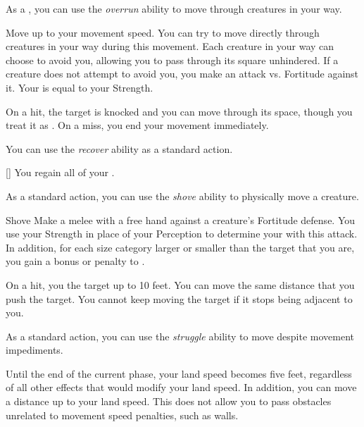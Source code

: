         As a , you can use the \textit{overrun} ability to move through creatures in your way.

        \begin{freeability}{}
            Move up to your movement speed.
            You can try to move directly through creatures in your way during this movement.
            Each creature in your way can choose to avoid you, allowing you to pass through its square unhindered.
            If a creature does not attempt to avoid you, you make an attack vs. Fortitude against it.
            Your  is equal to your Strength.

            On a hit, the target is knocked  and you can move through its space, though you treat it as .
            On a miss, you end your movement immediately.
        \end{freeability}

         You can use the \textit{recover} ability as a standard action.
        \begin{apability}{}[]
            You regain all of your .
        \end{apability}

         As a standard action, you can use the \textit{shove} ability to physically move a creature.

        \begin{freeability}{Shove}\label{Shove}
            Make a melee  with a free hand against a creature's Fortitude defense.
            You use your Strength in place of your Perception to determine your  with this attack.
            In addition, for each size category larger or smaller than the target that you are, you gain a  bonus or penalty to .

            On a hit, you  the target up to 10 feet.
            You can move the same distance that you push the target.
            You cannot keep moving the target if it stops being adjacent to you.
        \end{freeability}

         As a standard action, you can use the \textit{struggle} ability to move despite movement impediments.

        \begin{freeability}{}
            Until the end of the current phase, your land speed becomes five feet, regardless of all other effects that would modify your land speed.
            In addition, you can move a distance up to your land speed.
            This does not allow you to pass obstacles unrelated to movement speed penalties, such as walls.
        \end{freeability}

